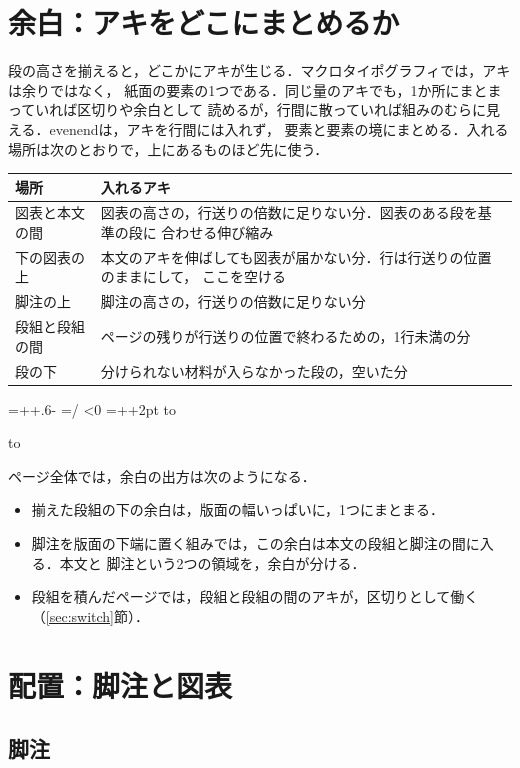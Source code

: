 \documentclass[twocolumn,paper=a4,fontsize=10pt]{jlreq}
\newenvironment{gyouhako}{\par
  \begin{lrbox}{\gyouhakobox}\begin{minipage}{\linewidth}}
  {\end{minipage}\end{lrbox}%
  \dimen0=\dimexpr\ht\gyouhakobox+\dp\gyouhakobox+.6\baselineskip-\topskip-2pt\relax
  \gyoulines=\numexpr\dimen0/\baselineskip\relax
  \ifdim\dimexpr\baselineskip*\gyoulines\relax<\dimen0 \advance\gyoulines 1 \fi
  \ifnum\gyoulines<0 \gyoulines=0 \fi
  \dimen2=\dimexpr\topskip+\baselineskip*\gyoulines+2pt\relax
  \noindent\vbox to\topskip{\vbox to\dimen2{\vss\box\gyouhakobox\vss}\vss}\par
  \nobreak\nointerlineskip\vbox to\gyoulines\baselineskip{}}
\newenvironment{hyou}{\begin{gyouhako}\centering\small}{\end{gyouhako}}
\begin{document}
\section{余白：アキをどこにまとめるか}\label{sec:space}

段の高さを揃えると，どこかにアキが生じる．マクロタイポグラフィでは，アキは余りではなく，
紙面の要素の1つである．同じ量のアキでも，1か所にまとまっていれば区切りや余白として
読めるが，行間に散っていれば組みのむらに見える．evenendは，アキを行間には入れず，
要素と要素の境にまとめる．入れる場所は次のとおりで，上にあるものほど先に使う．
\begin{hyou}
  \begin{tabular}{@{}P{.3\linewidth}P{.64\linewidth}@{}}
    \hline
    場所 & 入れるアキ \\
    \hline
    図表と本文の間 & 図表の高さの，行送りの倍数に足りない分．図表のある段を基準の段に
      合わせる伸び縮み \\
    下の図表の上 & 本文のアキを伸ばしても図表が届かない分．行は行送りの位置のままにして，
      ここを空ける \\
    脚注の上 & 脚注の高さの，行送りの倍数に足りない分 \\
    段組と段組の間 & ページの残りが行送りの位置で終わるための，1行未満の分 \\
    段の下 & 分けられない材料が入らなかった段の，空いた分 \\
    \hline
  \end{tabular}
\end{hyou}

ページ全体では，余白の出方は次のようになる．
\begin{itemize}
  \item 揃えた段組の下の余白は，版面の幅いっぱいに，1つにまとまる．
  \item 脚注を版面の下端に置く組みでは，この余白は本文の段組と脚注の間に入る．本文と
    脚注という2つの領域を，余白が分ける．
  \item 段組を積んだページでは，段組と段組の間のアキが，区切りとして働く
    （\ref{sec:switch}節）．
\end{itemize}

\section{配置：脚注と図表}\label{sec:place}

\subsection{脚注}
\end{document}
